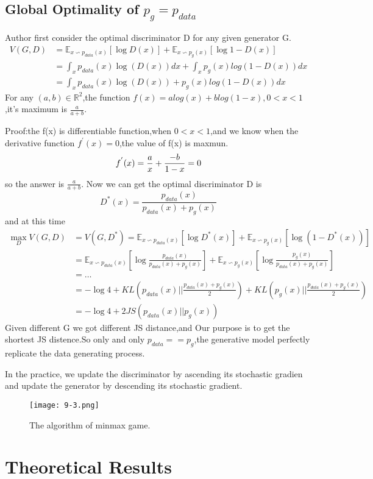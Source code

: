 \documentclass[10pt,letterpaper]{article}
\begin{document}
\subsection{Global Optimality of $p_{g} = p_{data}$}
Author first consider the optimal discriminator D for any given generator G.
\begin{equation}
\begin{aligned}
V(G,D) &= \mathbb{E}_{x \backsim p_{data}(x)} \left[\log{D(x)} \right]
+ \mathbb{E}_{x \backsim p_{g}(x)}\left[\log{1-D(x)} \right]\\
&= \int_{x} p_{data}(x)\log{(D(x))} dx + \int_{x} p_{g}(x)log(1-D(x))dx\\
&= \int_{x} p_{data}(x)\log{(D(x))} + p_{g}(x)log{(1-D(x))} dx
\end{aligned}
\end{equation}
For any $(a,b)\in{\mathbb{R}^{2}}$,the function $f(x) = alog(x)+blog(1-x),0 < x < 1 $,it's maximum is $\frac{a}{a+b}$.\par
Proof:the f(x) is differentiable function,when $0 < x < 1$,and we know when the derivative function $f^{'}(x) = 0$,the value of f(x) is maxmun. 
\begin{equation}
f^{'}(x) = \frac{a}{x}+\frac{-b}{1-x} = 0\\ 
\end{equation}
so the answer is $\frac{a}{a+b}$.
Now we can get the optimal discriminator D is
\begin{equation}
D^{*}(x) = \frac{p_{data}(x)}{p_{data}(x)+p_{g}(x)}
\end{equation}
and at this time
\begin{equation}
\begin{aligned}
\max_{D}V(G,D) &= V(G,D^{*}) = 
\mathbb{E}_{x \backsim p_{data}(x)} \left[\log{D^{*}(x)} \right] 
+ \mathbb{E}_{x \backsim p_{g}(x)}\left[\log{(1-D^{*}(x))} \right]\\
&= \mathbb{E}_{x \backsim p_{data}(x)} \left[\log{ \frac{p_{data}(x)}{p_{data}(x)+p_{g}(x)}} \right] 
+ \mathbb{E}_{x \backsim p_{g}(x)}\left[\log{\frac{p_{g}(x)}{p_{data}(x)+p_{g}(x)}} \right]\\
&= \dots\\
&= -\log{4} + KL(p_{data}(x)||\frac{p_{data}(x)+p_{g}(x)}{2})+ KL(p_{g}(x)||\frac{p_{data}(x)+p_{g}(x)}{2})\\
&= -\log4 + 2JS(p_{data}(x)||p_{g}(x))
\end{aligned}
\end{equation}
Given different G we got different JS distance,and Our purpose is to get the shortest JS distence.So only and only $p_{data} == p_{g}$,the generative model perfectly replicate the data generating process.\par
In the practice, we update the discriminator by ascending its stochastic gradien and update the generator by descending its stochastic gradient.
\begin{figure*}[htb]
\centering
\texttt{[image: 9-3.png]}
\caption{The algorithm of minmax game.}
\label{fig:firstpicture2}
\end{figure*}
\section{Theoretical Results}


{\small


}
\end{document}
